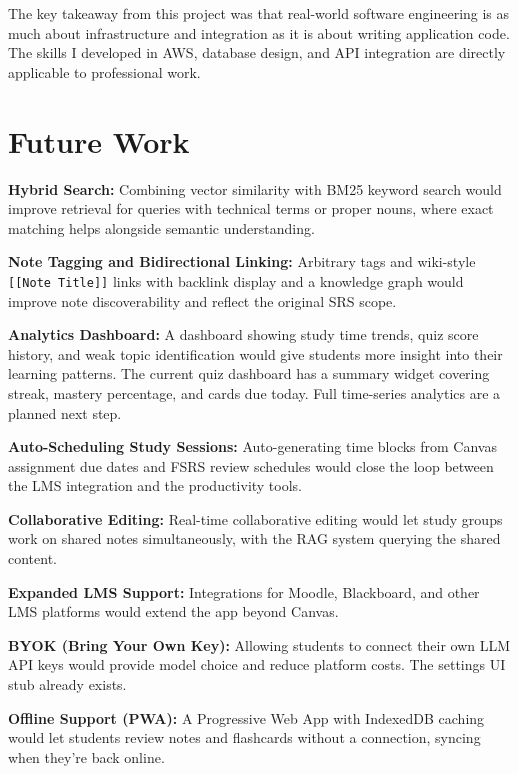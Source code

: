 \documentclass[12pt,a4paper]{article}
\begin{document}
The key takeaway from this project was that real-world software engineering is as much about infrastructure and integration as it is about writing application code. The skills I developed in AWS, database design, and API integration are directly applicable to professional work.


\section{Future Work}
\label{sec:future}

\textbf{Hybrid Search:} Combining vector similarity with BM25 keyword search would improve retrieval for queries with technical terms or proper nouns, where exact matching helps alongside semantic understanding.

\textbf{Note Tagging and Bidirectional Linking:} Arbitrary tags and wiki-style \texttt{[[Note Title]]} links with backlink display and a knowledge graph would improve note discoverability and reflect the original SRS scope.

\textbf{Analytics Dashboard:} A dashboard showing study time trends, quiz score history, and weak topic identification would give students more insight into their learning patterns. The current quiz dashboard has a summary widget covering streak, mastery percentage, and cards due today. Full time-series analytics are a planned next step.

\textbf{Auto-Scheduling Study Sessions:} Auto-generating time blocks from Canvas assignment due dates and FSRS review schedules would close the loop between the LMS integration and the productivity tools.

\textbf{Collaborative Editing:} Real-time collaborative editing would let study groups work on shared notes simultaneously, with the RAG system querying the shared content.

\textbf{Expanded LMS Support:} Integrations for Moodle, Blackboard, and other LMS platforms would extend the app beyond Canvas.

\textbf{BYOK (Bring Your Own Key):} Allowing students to connect their own LLM API keys would provide model choice and reduce platform costs. The settings UI stub already exists.

\textbf{Offline Support (PWA):} A Progressive Web App with IndexedDB caching would let students review notes and flashcards without a connection, syncing when they're back online.
\end{document}
